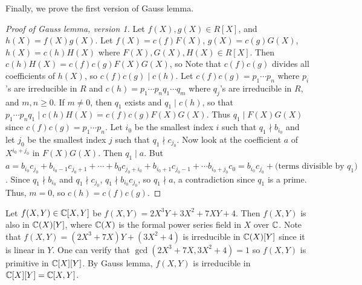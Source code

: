 Finally, we prove the first version of Gauss lemma.
\begin{proof}[Proof of Gauss lemma, version 1]
    Let $f(X), g(X) \in R[X]$, and $h(X) = f(X) g(X)$. Let $f(X) = c(f) F(X)$, $g(X) = c(g) G(X)$, $h(X) = c(h) H(X)$ where $F(X),G(X),H(X) \in R[X]$.
    Then $c(h) H(X) = c(f) c(g) F(X) G(X)$, so Note that $c(f) c(g)$ divides all coefficients of $h(X)$, so $c(f) c(g) \mid c(h)$. Let $c(f) c(g) = p_{1} \cdots p_{n}$ where $p_{i}$'s are irreducible in $R$ and $c(h) = p_{1} \cdots p_{n} q_{1} \cdots q_{m}$ where $q_{j}$'s are irreducible in $R$, and $m,n \geq 0$. If $m \neq 0$, then $q_{1}$ exists and $q_{1} \mid c(h)$, so that $p_{1} \cdots p_{n} q_{1} \mid c(h) H(X) = c(f) c(g) F(X) G(X)$. Thus $q_{1} \mid F(X) G(X)$ since $c(f) c(g) = p_{1} \cdots p_{n}$. Let $i_{0}$ be the smallest index $i$ such that $q_{1} \nmid b_{i_{0}}$ and let $j_{0}$ be the smallest index $j$ such that $q_{1} \nmid c_{j_{0}}$. Now look at the coefficient $a$ of $X^{i_{0}+j_{0}}$ in $F(X)G(X)$. Then $q_{1} \mid a$. But $a = b_{i_{0}}c_{j_{0}} + b_{i_{0}-1} c_{j_{0}+1} + \cdots + b_{0} c_{j_{0}+i_{0}} + b_{i_{0}+1}c_{j_{0}-1} + \cdots b_{i_{0}+j_{0}} c_{0} = b_{i_{0}} c_{j_{0}} + \text{(terms divisible by $q_{1}$)}$. Since $q_{1} \nmid b_{i_{0}}$ and $q_{1} \nmid c_{j_{0}}$, $q_{1} \nmid b_{i_{0}} c_{j_{0}}$, so $q_{1} \nmid a$, a contradiction since $q_{1}$ is a prime. Thus, $m = 0$, so $c(h) = c(f) c(g)$.
\end{proof}

\begin{example}
    Let $f(X,Y) \in \mathbb{C}[X,Y]$ be $f(X,Y) = 2X^{3}Y + 3X^{2} + 7XY + 4$. Then $f(X,Y)$ is also in $\mathbb{C}(X)[Y]$, where $\mathbb{C}(X)$ is the formal power series field in $X$ over $\mathbb{C}$. Note that $f(X,Y) = (2X^3+7X) Y + (3X^2 + 4)$ is irreducible in $\mathbb{C}(X)[Y]$ since it is linear in $Y$. One can verify that $\gcd(2X^{3}+7X, 3X^{2}+4) = 1$ so $f(X,Y)$ is primitive in $\mathbb{C}[X][Y]$. By Gauss lemma, $f(X,Y)$ is irreducible in $\mathbb{C}[X][Y] = \mathbb{C}[X,Y]$.
\end{example}

